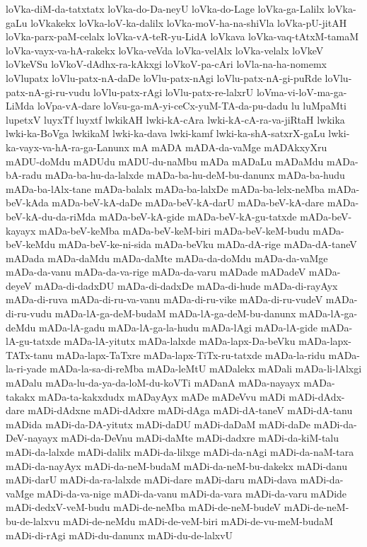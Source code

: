 {loVka-diM-da-tatxtatx
loVka-do-Da-neyU
loVka-do-Lage
loVka-ga-Lalilx
loVka-gaLu
loVkakekx
loVka-loV-ka-dalilx
loVka-moV-ha-na-shiVla
loVka-pU-jitAH
loVka-parx-paM-celalx
loVka-vA-teR-yu-LidA
loVkava
loVka-vaq-tAtxM-tamaM
loVka-vayx-va-hA-rakekx
loVka-veVda
loVka-velAlx
loVka-velalx
loVkeV
loVkeVSu
loVkoV-dAdhx-ra-kAkxgi
loVkoV-pa-cAri
loVla-na-ha-nomemx
loVlupatx
loVlu-patx-nA-daDe
loVlu-patx-nAgi
loVlu-patx-nA-gi-puRde
loVlu-patx-nA-gi-ru-vudu
loVlu-patx-rAgi
loVlu-patx-re-lalxrU
loVma-vi-loV-ma-ga-LiMda
loVpa-vA-dare
loVsu-ga-mA-yi-ceCx-yuM-TA-da-pu-dadu
lu
luMpaMti
lupetxV
luyxTf
luyxtf
lwkikAH
lwki-kA-cAra
lwki-kA-cA-ra-va-jiRtaH
lwkika
lwki-ka-BoVga
lwkikaM
lwki-ka-dava
lwki-kamf
lwki-ka-shA-satxrX-gaLu
lwki-ka-vayx-va-hA-ra-ga-Lanunx
mA
mADA
mADA-da-vaMge
mADAkxyXru
mADU-doMdu
mADUdu
mADU-du-naMbu
mADa
mADaLu
mADaMdu
mADa-bA-radu
mADa-ba-hu-da-lalxde
mADa-ba-hu-deM-bu-danunx
mADa-ba-hudu
mADa-ba-lAlx-tane
mADa-balalx
mADa-ba-lalxDe
mADa-ba-lelx-neMba
mADa-beV-kAda
mADa-beV-kA-daDe
mADa-beV-kA-darU
mADa-beV-kA-dare
mADa-beV-kA-du-da-riMda
mADa-beV-kA-gide
mADa-beV-kA-gu-tatxde
mADa-beV-kayayx
mADa-beV-keMba
mADa-beV-keM-biri
mADa-beV-keM-budu
mADa-beV-keMdu
mADa-beV-ke-ni-sida
mADa-beVku
mADa-dA-rige
mADa-dA-taneV
mADada
mADa-daMdu
mADa-daMte
mADa-da-doMdu
mADa-da-vaMge
mADa-da-vanu
mADa-da-va-rige
mADa-da-varu
mADade
mADadeV
mADa-deyeV
mADa-di-dadxDU
mADa-di-dadxDe
mADa-di-hude
mADa-di-rayAyx
mADa-di-ruva
mADa-di-ru-va-vanu
mADa-di-ru-vike
mADa-di-ru-vudeV
mADa-di-ru-vudu
mADa-lA-ga-deM-budaM
mADa-lA-ga-deM-bu-danunx
mADa-lA-ga-deMdu
mADa-lA-gadu
mADa-lA-ga-la-hudu
mADa-lAgi
mADa-lA-gide
mADa-lA-gu-tatxde
mADa-lA-yitutx
mADa-lalxde
mADa-lapx-Da-beVku
mADa-lapx-TATx-tanu
mADa-lapx-TaTxre
mADa-lapx-TiTx-ru-tatxde
mADa-la-ridu
mADa-la-ri-yade
mADa-la-sa-di-reMba
mADa-leMtU
mADalekx
mADali
mADa-li-lAlxgi
mADalu
mADa-lu-da-ya-da-loM-du-koVTi
mADanA
mADa-nayayx
mADa-takakx
mADa-ta-kakxdudx
mADayAyx
mADe
mADeVvu
mADi
mADi-dAdx-dare
mADi-dAdxne
mADi-dAdxre
mADi-dAga
mADi-dA-taneV
mADi-dA-tanu
mADida
mADi-da-DA-yitutx
mADi-daDU
mADi-daDaM
mADi-daDe
mADi-da-DeV-nayayx
mADi-da-DeVnu
mADi-daMte
mADi-dadxre
mADi-da-kiM-talu
mADi-da-lalxde
mADi-dalilx
mADi-da-lilxge
mADi-da-nAgi
mADi-da-naM-tara
mADi-da-nayAyx
mADi-da-neM-budaM
mADi-da-neM-bu-dakekx
mADi-danu
mADi-darU
mADi-da-ra-lalxde
mADi-dare
mADi-daru
mADi-dava
mADi-da-vaMge
mADi-da-va-nige
mADi-da-vanu
mADi-da-vara
mADi-da-varu
mADide
mADi-dedxV-veM-budu
mADi-de-neMba
mADi-de-neM-budeV
mADi-de-neM-bu-de-lalxvu
mADi-de-neMdu
mADi-de-veM-biri
mADi-de-vu-meM-budaM
mADi-di-rAgi
mADi-du-danunx
mADi-du-de-lalxvU
}
